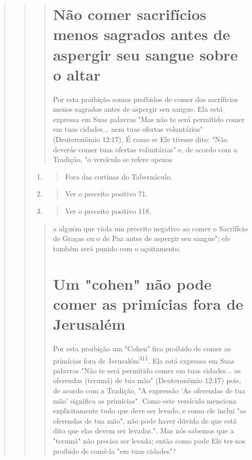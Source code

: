 \begin{quote}
\begin{quote}
\begin{quote}
\section{Não comer sacrifícios menos sagrados antes de aspergir seu sangue sobre o altar}

Por esta proibição somos proibidos de comer dos sacríficios menos
sagrados antes de aspergir seu sangue. Ela está expressa em Suas
palavras "Mas não te será permitido comer em tuas cidades... nem tuas
ofertas voluntárias" (Deuteronômio 12:17). É como se Ele tivesse dito:
"Não deverás comer tuas ofertas voluntárias" e, de acordo com a
Tradição, "o versículo se refere apenas
\end{quote}

\begin{enumerate}
\def\labelenumi{\arabic{enumi}.}
\setcounter{enumi}{306}
\item
 \begin{quote}
 Fora das cortinas do Tabernáculo.
 \end{quote}
\item
 \begin{quote}
 Ver o preceito positivo 71.
 \end{quote}
\item
 \begin{quote}
 Ver o preceito positivo 118.
 \end{quote}
\end{enumerate}

\begin{quote}a alguém que viola um preceito negativo ao comer o Sacrifício de Graças
ou o de Paz antes de aspergir seu sangue"; ele também será punido com o
açoitamento.

\section{Um "cohen" não pode comer as primícias fora de Jerusalém}

Por esta proibição um "Cohen" fica proibido de comer as primícias fora
de Jerusalém\textsuperscript{311}. Ela está expressa em Suas palavras
"Não te será permiti­do comer em tuas cidades... as oferendas (terumá)
de tua mão" (Deuteronômio 12:17) pois, de acordo com a Tradição, "A
expressão 'As oferendas de tua mão' significa as primícias". Como este
versículo menciona explicitamente tudo que deve ser levado, e como ele
inclui "as oferendas de tua mão", não pode haver dúvida de que está dito
que elas devem ser levadas.". Mas nós sabemos que a
"terumá" não precisa ser levada; então como pode Ele ter-nos proibido de
comê-la "em tuas cidades"?


\end{quote}
\end{quote}
\end{quote}
